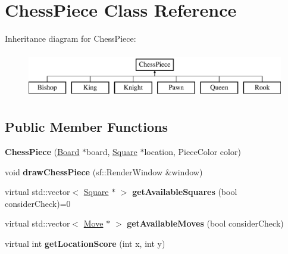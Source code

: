 \hypertarget{class_chess_piece}{}\section{Chess\+Piece Class Reference}
\label{class_chess_piece}
Inheritance diagram for Chess\+Piece\+:\begin{figure}[H]
\begin{center}
\leavevmode
\includegraphics[height=2.000000cm]{class_chess_piece}
\end{center}
\end{figure}
\subsection*{Public Member Functions}
\begin{DoxyCompactItemize}
\item 
\mbox{\label{class_chess_piece_a4a74c820a7e6999ba71184bb4b276782}} 
{\bfseries Chess\+Piece} (\mbox{\hyperlink{class_board}{Board}} $\ast$board, \mbox{\hyperlink{class_square}{Square}} $\ast$location, Piece\+Color color)
\item 
\mbox{\label{class_chess_piece_aca89f884439b41fb8e5810d5c2a798fc}} 
void {\bfseries draw\+Chess\+Piece} (sf\+::\+Render\+Window \&window)
\item 
\mbox{\label{class_chess_piece_a864599823fa1735a1ddda632beb97bbb}} 
virtual std\+::vector$<$ \mbox{\hyperlink{class_square}{Square}} $\ast$ $>$ {\bfseries get\+Available\+Squares} (bool consider\+Check)=0
\item 
\mbox{\label{class_chess_piece_ad071550868f5c48aec1a5e4a3cb5ed6f}} 
virtual std\+::vector$<$ \mbox{\hyperlink{class_move}{Move}} $\ast$ $>$ {\bfseries get\+Available\+Moves} (bool consider\+Check)
\item 
\mbox{\label{class_chess_piece_a712fb4fa01285d525c256e9da2787031}} 
virtual int {\bfseries get\+Location\+Score} (int x, int y)
\end{DoxyCompactItemize}
